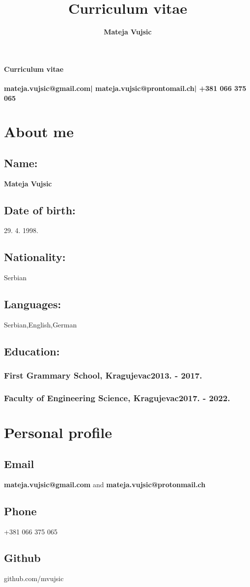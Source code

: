 \documentclass[10pt]{article}
\title{Curriculum vitae}
\author{\textbf{Mateja Vujsic}}
\makeatletter
\renewcommand{\maketitle}{
	\begin{center}
	{\Large\textbf{Curriculum vitae}}\\
	\vspace{.62em}
	{\huge\bfseries\theauthor}\\
	\vspace{.62em}
	{\bfseries{mateja.vujsic@gmail.com| mateja.vujsic@prontomail.ch| +381 066 375 065}}
	\end{center}
}
\makeatother
\begin{document}
\maketitle

\section{About me}
\subsection{\large{Name:}}
\textbf{\large{Mateja Vujsic}}
\subsection{\large{Date of birth:}}
\large{29. 4. 1998.}
\subsection{\large{Nationality:}}
\large{Serbian}
\subsection{\large{Languages:}}
\large{Serbian,English,German}
\subsection{\large{Education:}}
\subsubsection{First Grammary School, Kragujevac\hfill 2013. - 2017.}
\subsubsection{Faculty of Engineering Science, Kragujevac\hfill 2017. - 2022.}

\section{Personal profile}
\subsection{Email}
\textbf{mateja.vujsic@gmail.com} and \textbf{mateja.vujsic@protonmail.ch}
\subsection{Phone}
+381 066 375 065
\subsection{Github}
github.com/mvujsic
\end{document}

